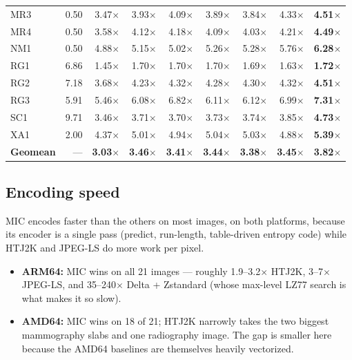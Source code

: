\documentclass[11pt]{article}
\begin{document}
\begin{table}[htbp]
{\begin{tabular}{lrrrrrrrr}
MR3  & 0.50 & 3.47$\times$ & 3.93$\times$ & 4.09$\times$ & 3.89$\times$ & 3.84$\times$ & 4.33$\times$ & \textbf{4.51$\times$} \\
MR4  & 0.50 & 3.58$\times$ & 4.12$\times$ & 4.18$\times$ & 4.09$\times$ & 4.03$\times$ & 4.21$\times$ & \textbf{4.49$\times$} \\
NM1  & 0.50 & 4.88$\times$ & 5.15$\times$ & 5.02$\times$ & 5.26$\times$ & 5.28$\times$ & 5.76$\times$ & \textbf{6.28$\times$} \\
RG1  & 6.86 & 1.45$\times$ & 1.70$\times$ & 1.70$\times$ & 1.70$\times$ & 1.69$\times$ & 1.63$\times$ & \textbf{1.72$\times$} \\
RG2  & 7.18 & 3.68$\times$ & 4.23$\times$ & 4.32$\times$ & 4.28$\times$ & 4.30$\times$ & 4.32$\times$ & \textbf{4.51$\times$} \\
RG3  & 5.91 & 5.46$\times$ & 6.08$\times$ & 6.82$\times$ & 6.11$\times$ & 6.12$\times$ & 6.99$\times$ & \textbf{7.31$\times$} \\
SC1  & 9.71 & 3.46$\times$ & 3.71$\times$ & 3.70$\times$ & 3.73$\times$ & 3.74$\times$ & 3.85$\times$ & \textbf{4.73$\times$} \\
XA1  & 2.00 & 4.37$\times$ & 5.01$\times$ & 4.94$\times$ & 5.04$\times$ & 5.03$\times$ & 4.88$\times$ & \textbf{5.39$\times$} \\
\midrule
\textbf{Geomean} & --- & \textbf{3.03$\times$} & \textbf{3.46$\times$} & \textbf{3.41$\times$} & \textbf{3.44$\times$} & \textbf{3.38$\times$} & \textbf{3.45$\times$} & \textbf{3.82$\times$} \\
\bottomrule
\end{tabular}}
\end{table}

\subsection{Encoding speed}

MIC encodes faster than the others on most images, on both platforms,
because its encoder is a single pass (predict, run-length, table-driven
entropy code) while HTJ2K and JPEG-LS do more work per pixel.

\begin{itemize}
  \item \textbf{ARM64:} MIC wins on all 21 images --- roughly 1.9--3.2$\times$
  HTJ2K, 3--7$\times$ JPEG-LS, and 35--240$\times$ Delta + Zstandard (whose
  max-level LZ77 search is what makes it so slow).
  \item \textbf{AMD64:} MIC wins on 18 of 21; HTJ2K narrowly takes the two
  biggest mammography slabs and one radiography image. The gap is smaller here
  because the AMD64 baselines are themselves heavily vectorized.
\end{itemize}
\end{document}
